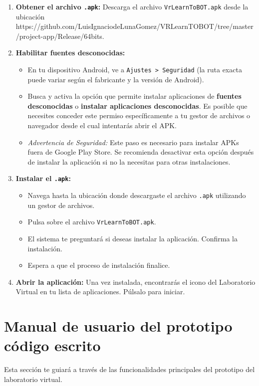\begin{enumerate}
	\item \textbf{Obtener el archivo \texttt{.apk}:} Descarga el archivo \texttt{VrLearnToBOT.apk}  desde la ubicación https://github.com/LuisIgnaciodeLunaGomez/VRLearnTOBOT/tree/master/project-app/Release/64bits.
	\item \textbf{Habilitar fuentes desconocidas:}
	\begin{itemize}
		\item En tu dispositivo Android, ve a \texttt{Ajustes > Seguridad} (la ruta exacta puede variar según el fabricante y la versión de Android).
		\item Busca y activa la opción que permite instalar aplicaciones de \textbf{fuentes desconocidas} o \textbf{instalar aplicaciones desconocidas}. Es posible que necesites conceder este permiso específicamente a tu gestor de archivos o navegador desde el cual intentarás abrir el APK.
		\item \textit{Advertencia de Seguridad:} Este paso es necesario para instalar APKs fuera de Google Play Store. Se recomienda desactivar esta opción después de instalar la aplicación si no la necesitas para otras instalaciones.
	\end{itemize}
	\item \textbf{Instalar el \texttt{.apk}:}
	\begin{itemize}
		\item Navega hasta la ubicación donde descargaste el archivo \texttt{.apk} utilizando un gestor de archivos.
		\item Pulsa sobre el archivo \texttt{VrLearnToBOT.apk}.
		\item El sistema te preguntará si deseas instalar la aplicación. Confirma la instalación.
		\item Espera a que el proceso de instalación finalice.
	\end{itemize}
	\item \textbf{Abrir la aplicación:} Una vez instalada, encontrarás el icono del Laboratorio Virtual en tu lista de aplicaciones. Púlsalo para iniciar.
\end{enumerate}

\section{Manual de usuario del prototipo código escrito}
Esta sección te guiará a través de las funcionalidades principales del prototipo del laboratorio virtual.


